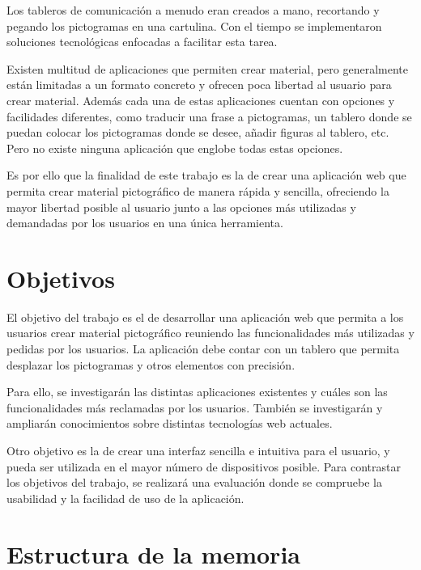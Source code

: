 Los tableros de comunicación a menudo eran creados a mano, recortando y pegando los pictogramas en una cartulina. Con el tiempo se implementaron soluciones tecnológicas enfocadas a facilitar esta tarea. 

Existen multitud de aplicaciones que permiten crear material, pero generalmente están limitadas a un formato concreto y ofrecen poca libertad al usuario para crear material. Además cada una de estas aplicaciones cuentan con opciones y facilidades diferentes, como traducir una frase a pictogramas, un tablero donde se puedan colocar los pictogramas donde se desee, añadir figuras al tablero, etc. Pero no existe ninguna aplicación que englobe todas estas opciones. 

Es por ello que la finalidad de este trabajo es la de crear una aplicación web que permita crear material pictográfico de manera rápida y sencilla, ofreciendo la mayor libertad posible al usuario junto a las opciones más utilizadas y demandadas por los usuarios en una única herramienta. 





\section{Objetivos}
\label{cap1:sec:Objetivos}


El objetivo del trabajo es el de desarrollar una aplicación web que permita a los usuarios crear material pictográfico reuniendo las funcionalidades más utilizadas y pedidas por los usuarios. La aplicación debe contar con un tablero que permita desplazar los pictogramas y otros elementos con precisión.

Para ello, se investigarán las distintas aplicaciones existentes y cuáles son las funcionalidades más reclamadas por los usuarios. También se investigarán y ampliarán conocimientos sobre distintas tecnologías web actuales. 

Otro objetivo es la de crear una interfaz sencilla e intuitiva para el usuario, y pueda ser utilizada en el mayor número de dispositivos posible. Para contrastar los objetivos del trabajo, se realizará una evaluación donde se compruebe la usabilidad y la facilidad de uso de la aplicación. 








\section{Estructura de la memoria}
\label{cap1:sec:Estructura}

